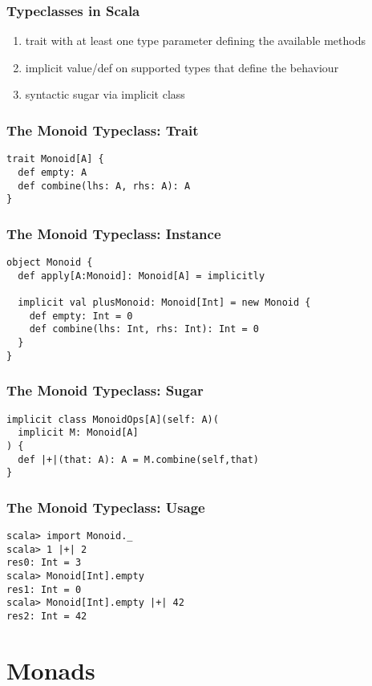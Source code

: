 \documentclass{beamer}
\begin{document}
\begin{frame}
  \frametitle{Typeclasses in Scala}
  \begin{enumerate}
  \item trait with at least one type parameter defining the available
    methods
  \item implicit value/def on supported types that define the
    behaviour
  \item syntactic sugar via implicit class
  \end{enumerate}
\end{frame}

\begin{frame}[fragile]
  \frametitle{The Monoid Typeclass: Trait}
\begin{verbatim}
trait Monoid[A] {
  def empty: A
  def combine(lhs: A, rhs: A): A
}
\end{verbatim}
\end{frame}

\begin{frame}[fragile]
  \frametitle{The Monoid Typeclass: Instance}
\begin{verbatim}
object Monoid {
  def apply[A:Monoid]: Monoid[A] = implicitly

  implicit val plusMonoid: Monoid[Int] = new Monoid {
    def empty: Int = 0
    def combine(lhs: Int, rhs: Int): Int = 0
  }
}
\end{verbatim}
\end{frame}

\begin{frame}[fragile]
  \frametitle{The Monoid Typeclass: Sugar}
\begin{verbatim}
implicit class MonoidOps[A](self: A)(
  implicit M: Monoid[A]
) {
  def |+|(that: A): A = M.combine(self,that)
}
\end{verbatim}
\end{frame}

\begin{frame}[fragile]
  \frametitle{The Monoid Typeclass: Usage}
\begin{verbatim}
scala> import Monoid._
scala> 1 |+| 2
res0: Int = 3
scala> Monoid[Int].empty
res1: Int = 0
scala> Monoid[Int].empty |+| 42
res2: Int = 42
\end{verbatim}
\end{frame}

\section{Monads}
\end{document}
